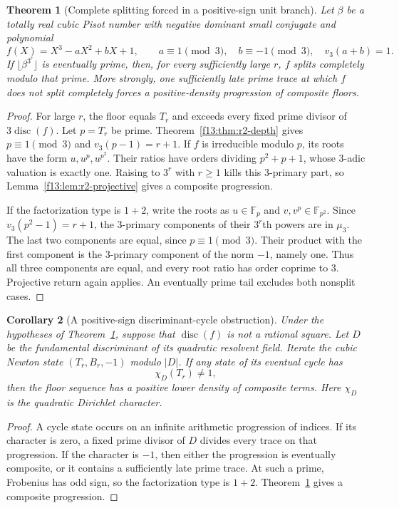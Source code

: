 \documentclass[11pt,a4paper]{article}
\newtheorem{theorem}{Theorem}[section]
\newtheorem{corollary}[theorem]{Corollary}
\theoremstyle{definition}
\theoremstyle{remark}
\numberwithin{equation}{section}
\begin{document}
\begin{theorem}[Complete splitting forced in a positive-sign unit branch]
\label{f13:thm:r2-splitbranch}
Let $\beta$ be a totally real cubic Pisot number with negative
dominant small conjugate and polynomial
\[
 f(X)=X^3-aX^2+bX+1,
 \qquad a\equiv1\pmod3,\quad b\equiv-1\pmod3,
 \quad v_3(a+b)=1.
\]
If $\lfloor\beta^{3^r}\rfloor$ is eventually prime, then, for every
sufficiently large $r$, $f$ splits completely modulo that prime.
More strongly, one sufficiently late prime trace at which $f$
does not split completely forces a positive-density progression
of composite floors.
\end{theorem}
\begin{proof}
For large $r$, the floor equals $T_r$ and exceeds every fixed
prime divisor of $3\operatorname{disc}(f)$. Let $p=T_r$ be prime.
Theorem~\ref{f13:thm:r2-depth} gives
$p\equiv1\pmod3$ and $v_3(p-1)=r+1$.
If $f$ is irreducible modulo $p$, its roots have the form
$u,u^p,u^{p^2}$. Their ratios have orders dividing $p^2+p+1$,
whose $3$-adic valuation is exactly one. Raising to $3^r$ with
$r\ge1$ kills this $3$-primary part, so
Lemma~\ref{f13:lem:r2-projective} gives a composite progression.

If the factorization type is $1+2$, write the roots as
$u\in\mathbb F_p$ and $v,v^p\in\mathbb F_{p^2}$.
Since $v_3(p^2-1)=r+1$, the $3$-primary components of their
$3^r$th powers are in $\mu_3$. The last two components are equal,
since $p\equiv1\pmod3$. Their product with the first component
is the $3$-primary component of the norm $-1$, namely one.
Thus all three components are equal, and every root ratio has
order coprime to $3$. Projective return again applies.
An eventually prime tail excludes both nonsplit cases.
\end{proof}

\begin{corollary}[A positive-sign discriminant-cycle obstruction]
Under the hypotheses of Theorem~\ref{f13:thm:r2-splitbranch}, suppose
that $\operatorname{disc}(f)$ is not a rational square. Let $D$ be
the fundamental discriminant of its quadratic resolvent field.
Iterate the cubic Newton state $(T_r,B_r,-1)$ modulo $|D|$.
If any state of its eventual cycle has
\[
 \chi_D(T_r)\ne1,
\]
then the floor sequence has a positive lower density of composite
terms. Here $\chi_D$ is the quadratic Dirichlet character.
\end{corollary}
\begin{proof}
A cycle state occurs on an infinite arithmetic progression of
indices. If its character is zero, a fixed prime divisor of $D$
divides every trace on that progression. If the character is $-1$,
then either the progression is eventually composite, or it
contains a sufficiently late prime trace. At such a prime,
Frobenius has odd sign, so the factorization type is $1+2$.
Theorem~\ref{f13:thm:r2-splitbranch} gives a composite progression.
\end{proof}
\end{document}
